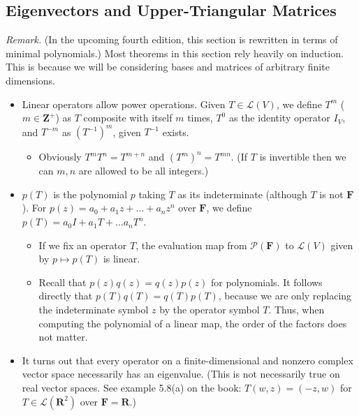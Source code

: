 \documentclass[11pt]{article}
\newcommand{\R}{\mathbf{R}}
\newcommand{\Z}{\mathbf{Z}}
\newcommand{\F}{\mathbf{F}}
\newcommand{\LV}{\mathcal{L}(V)}
\newcommand{\PF}{\mathcal{P}(\F)}
\begin{document}
\subsection{Eigenvectors and Upper-Triangular Matrices}
\textit{Remark.} (In the upcoming fourth edition, this section is rewritten in terms of minimal polynomials.) Most theorems in this section rely heavily on induction. This is because we will be considering bases and matrices of arbitrary finite dimensions.
\begin{itemize}
    \item Linear operators allow power operations. Given $T \in \LV$, we define $T^m$ ($m \in \Z^+$) as $T$ composite with itself $m$ times, $T^0$ as the identity operator $I_V$, and $T^{-m}$ as $(T^{-1})^m$, given $T^{-1}$ exists.
    \begin{itemize}
        \item Obviously $T^mT^n = T^{m+n}$ and $(T^m)^n = T^{mn}$. (If $T$ is invertible then we can $m,n$ are allowed to be all integers.)
    \end{itemize}
    \item $p(T)$ is the polynomial $p$ taking $T$ as its indeterminate (although $T$ is not $\F$). For $p(z) = a_0 + a_1 z + \dots + a_n z^n$ over $\F$, we define $p(T) = a_0 I + a_1 T + \dots a_n T^n$.
    \begin{itemize}
        \item If we fix an operator $T$, the evaluation map from $\PF$ to $\LV$ given by $p \mapsto p(T)$ is linear.
    	\item Recall that $p(z)q(z) = q(z)p(z)$ for polynomials. It follows directly that $p(T)q(T) = q(T)p(T)$, because we are only replacing the indeterminate symbol $z$ by the operator symbol $T$. Thus, when computing the polynomial of a linear map, the order of the factors does not matter.
    \end{itemize}
    \item It turns out that every operator on a finite-dimensional and nonzero complex vector space necessarily has an eigenvalue. (This is not necessarily true on real vector spaces. See example 5.8(a) on the book: $T(w,z) = (-z,w)$ for $T \in \mathcal{L}(\R^2)$ over $\F = \R$.) 
    

\end{itemize}
\end{document}
